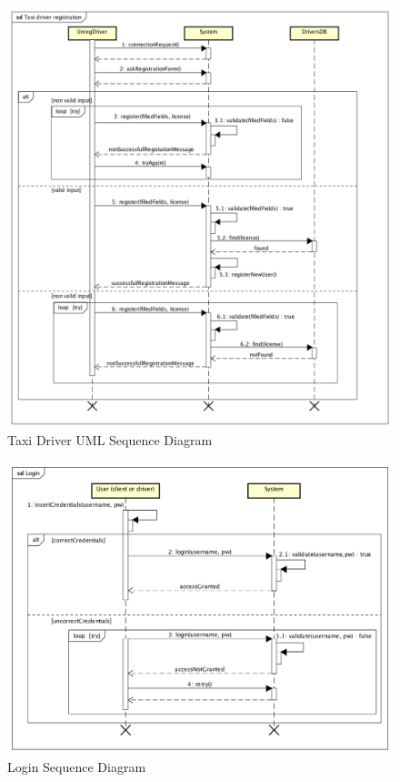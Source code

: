 \documentclass[a4paper]{article}
\begin{document}
\begin{enumerate}[label=\bfseries G\arabic*:]
\begin{figure}[H]
\includegraphics[width=\sequenceWidth]{Sequence-TaxiDriver-Registration}
\centering
\caption{Taxi Driver UML Sequence Diagram}
\label{fig:sequencetaxidriverregistration}
\end{figure}

\begin{figure}[H]
\includegraphics[width=\sequenceWidth]{Sequence-Login}
\centering
\caption{Login Sequence Diagram}
\label{fig:sequencelogin}
\end{figure}


\end{enumerate}
\end{document}
